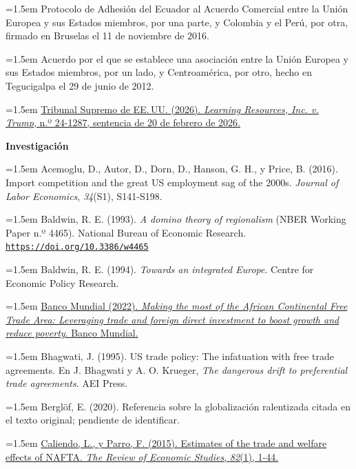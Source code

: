 \documentclass[10pt,a4paper]{article}
\begin{document}
\noindent\hangindent=1.5em Protocolo de Adhesión del Ecuador al Acuerdo Comercial entre la Unión Europea y sus Estados miembros, por una parte, y Colombia y el Perú, por otra, firmado en Bruselas el 11 de noviembre de 2016.

\noindent\hangindent=1.5em Acuerdo por el que se establece una asociación entre la Unión Europea y sus Estados miembros, por un lado, y Centroamérica, por otro, hecho en Tegucigalpa el 29 de junio de 2012.

\noindent\hangindent=1.5em \href{https://supreme.justia.com/cases/federal/us/607/24-1287/}{Tribunal Supremo de EE.\,UU. (2026). \textit{Learning Resources, Inc. v. Trump}, n.º 24-1287, sentencia de 20 de febrero de 2026.}

\textbf{Investigación}

\noindent\hangindent=1.5em Acemoglu, D., Autor, D., Dorn, D., Hanson, G. H., y Price, B. (2016). Import competition and the great US employment sag of the 2000s. \textit{Journal of Labor Economics}, \textit{34}(S1), S141-S198.

\noindent\hangindent=1.5em Baldwin, R. E. (1993). \textit{A domino theory of regionalism} (NBER Working Paper n.º 4465). National Bureau of Economic Research. \href{https://doi.org/10.3386/w4465}{\nolinkurl{https://doi.org/10.3386/w4465}}

\noindent\hangindent=1.5em Baldwin, R. E. (1994). \textit{Towards an integrated Europe}. Centre for Economic Policy Research.

\noindent\hangindent=1.5em \href{https://www.worldbank.org/en/topic/trade/publication/making-the-most-of-the-african-continental-free-trade-area}{Banco Mundial (2022). \textit{Making the most of the African Continental Free Trade Area: Leveraging trade and foreign direct investment to boost growth and reduce poverty}. Banco Mundial.}

\noindent\hangindent=1.5em Bhagwati, J. (1995). US trade policy: The infatuation with free trade agreements. En J. Bhagwati y A. O. Krueger, \textit{The dangerous drift to preferential trade agreements}. AEI Press.

\noindent\hangindent=1.5em Berglöf, E. (2020). Referencia sobre la globalización ralentizada citada en el texto original; pendiente de identificar.

\noindent\hangindent=1.5em \href{https://www.nber.org/papers/w18508}{Caliendo, L., y Parro, F. (2015). Estimates of the trade and welfare effects of NAFTA. \textit{The Review of Economic Studies}, \textit{82}(1), 1-44.}
\end{document}

